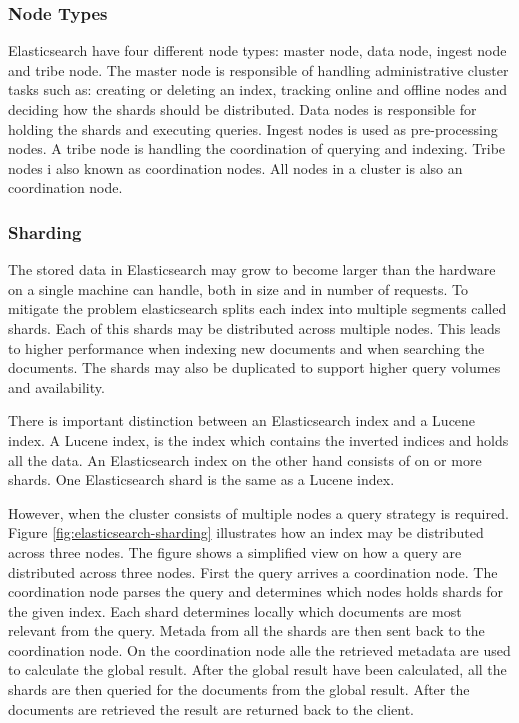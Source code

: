 \subsubsection{Node Types}
Elasticsearch have four different node types: master node, data node, ingest node and tribe node.
The master node is responsible of handling administrative cluster tasks such as:
creating or deleting an index, tracking online and offline nodes and deciding how the shards should be distributed.
Data nodes is responsible for holding the shards and executing queries.
Ingest nodes is used as pre-processing nodes.
A tribe node is handling the coordination of querying and indexing.
Tribe nodes i also known as coordination nodes.
All nodes in a cluster is also an coordination node.


\subsubsection{Sharding}
The stored data in Elasticsearch may grow to become larger than the hardware on a single machine can handle,
both in size and in number of requests.
To mitigate the problem elasticsearch splits each index into multiple segments called shards.
Each of this shards may be distributed across multiple nodes.
This leads to higher performance when indexing new documents and when searching the documents.
The shards may also be duplicated to support higher query volumes and availability.

There is important distinction between an Elasticsearch index and a Lucene index.
A Lucene index, is the index which contains the inverted indices and holds all the data.
An Elasticsearch index on the other hand consists of on or more shards.
One Elasticsearch shard is the same as a Lucene index.

However, when the cluster consists of multiple nodes a query strategy is required.
Figure \ref{fig:elasticsearch-sharding} illustrates how an index may be distributed across three nodes.
The figure shows a simplified view on how a query are distributed across three nodes.
First the query arrives a coordination node.
The coordination node parses the query and determines which nodes holds shards for the given index.
Each shard determines locally which documents are most relevant from the query.
Metada from all the shards are then sent back to the coordination node.
On the coordination node alle the retrieved metadata are used to calculate the global result.
After the global result have been calculated,
all the shards are then queried for the documents from the global result.
After the documents are retrieved the result are returned back to the client.


